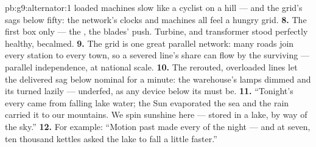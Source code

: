 \begin{solution}{pb:g9:alternator:1}
loaded machines slow like a cyclist on a hill --- and the
grid's  sags below fifty: the network's clocks and
machines all feel a hungry grid.
\textbf{8.} The first box only --- the , the blades'
push. Turbine,  and transformer stood perfectly
healthy, becalmed.
\textbf{9.} The grid is one great parallel network: many
roads join every station to every town, so a severed line's
share can flow by the surviving  --- parallel
independence, at national scale.
\textbf{10.} The rerouted, overloaded lines let the
delivered  sag below nominal for a minute: the
warehouse's lamps dimmed and its  turned lazily ---
underfed, as any device below its  must be.
\textbf{11.} ``Tonight's every  came from falling lake
water; the Sun evaporated the sea and the rain carried it to
our mountains. We spin sunshine here --- stored in a
lake, by way of the sky.''
\textbf{12.} For example: ``Motion past  made every
 of the night --- and at seven, ten thousand kettles
asked the lake to fall a little faster.''
\end{solution}
